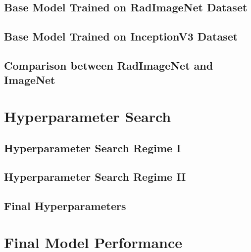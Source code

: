 \subsection{Base Model Trained on RadImageNet Dataset}



\subsection{Base Model Trained on InceptionV3 Dataset}



\subsection{Comparison between RadImageNet and ImageNet}

\section{Hyperparameter Search}

\subsection{Hyperparameter Search Regime I}









\subsection{Hyperparameter Search Regime II}





\subsection{Final Hyperparameters}

\section{Final Model Performance}
